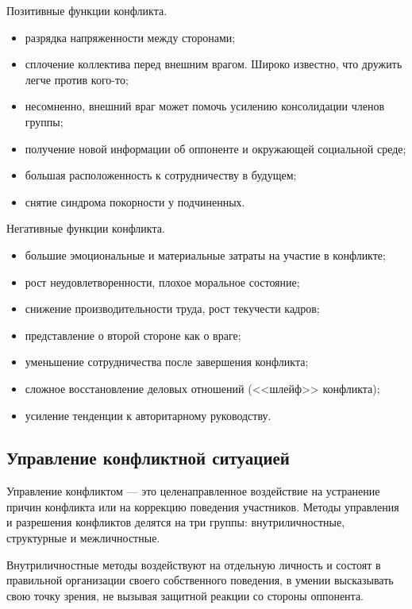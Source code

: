 \documentclass[a4paper,12pt,oneside,final]{extarticle}
\numberwithin{equation}{section}
\begin{document}
\begin{enumerate}
Позитивные функции конфликта.
\begin{itemize}
	\item разрядка напряженности между сторонами;
	\item сплочение коллектива перед внешним врагом. Широко известно, что дружить легче против кого-то;
	\item несомненно, внешний враг может помочь усилению консолидации членов группы;
	\item получение новой информации об оппоненте и окружающей социальной среде;
	\item большая расположенность к сотрудничеству в будущем;
	\item снятие синдрома покорности у подчиненных.
\end{itemize}

Негативные функции конфликта.
\begin{itemize}
	\item большие эмоциональные и материальные затраты на участие в конфликте;
	\item рост неудовлетворенности, плохое моральное состояние;
	\item снижение производительности труда, рост текучести кадров;
	\item представление о второй стороне как о враге;
	\item уменьшение сотрудничества после завершения конфликта;
	\item сложное восстановление деловых отношений (<<шлейф>> конфликта);
	\item усиление тенденции к авторитарному руководству.
\end{itemize}

\subsection{Управление конфликтной ситуацией}
Управление конфликтом --- это целенаправленное воздействие на устранение причин конфликта или на коррекцию поведения участников. 
Методы управления и разрешения конфликтов делятся на три группы: внутриличностные, структурные и межличностные.

Внутриличностные методы воздействуют на отдельную личность и состоят в правильной организации своего собственного поведения, в умении высказывать свою точку зрения, не вызывая защитной реакции со стороны оппонента.


\end{enumerate}
\end{document}
